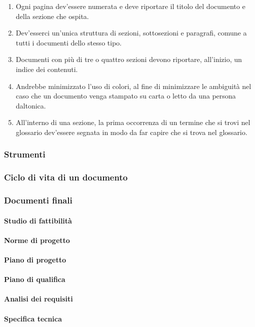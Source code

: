 \begin{enumerate}
	\item Ogni pagina dev'essere numerata e deve riportare il titolo del documento e della sezione che ospita. %
	\item Dev'esserci un'unica struttura di sezioni, sottosezioni e paragrafi, comune a tutti i documenti dello stesso tipo.
	\item Documenti con più di tre o quattro sezioni devono riportare, all'inizio, un indice dei contenuti.
	\item Andrebbe minimizzato l'uso di colori, al fine di minimizzare le ambiguità nel caso che un documento venga stampato su carta o letto da una persona daltonica.
	\item All'interno di una sezione, la prima occorrenza di un termine che si trovi nel glossario dev'essere segnata in modo da far capire che si trova nel glossario.
\end{enumerate}

		\subsubsection{Strumenti}
		\subsubsection{Ciclo di vita di un documento}
		\subsubsection{Documenti finali}
			\paragraph{Studio di fattibilità}
			\paragraph{Norme di progetto}
			\paragraph{Piano di progetto}
			\paragraph{Piano di qualifica}
			\paragraph{Analisi dei requisiti}
			\paragraph{Specifica tecnica}
